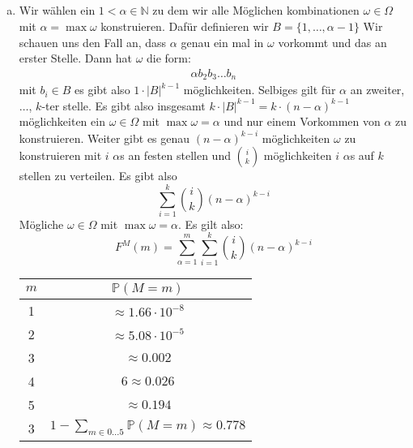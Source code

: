 \documentclass{article}
\newcommand{\N}{\mathbb{N}}
\begin{document}
    \subsection{}
    \begin{enumerate}[a)]
        \item
            Wir wählen ein $1<\alpha\in\N$ zu dem wir alle
            Möglichen kombinationen $\omega\in\Omega$ mit
            $\alpha=\max\omega$ konstruieren.
            Dafür definieren wir $B=\{1,\hdots,\alpha-1\}$
            Wir schauen uns den Fall an, dass $\alpha$ genau
            ein mal in $\omega$ vorkommt und das an erster
            Stelle. Dann hat $\omega$ die form:
            \begin{align*}
                \alpha b_2b_3\hdots b_n
            \end{align*}
            mit $b_i\in B$
            es gibt also $1 \cdot |B|^{k-1}$
            möglichkeiten.
            Selbiges gilt für $\alpha$ an zweiter, $\hdots$,
            $k$-ter stelle.
            Es gibt also insgesamt
            $k\cdot |B|^{k-1}=k\cdot (n-\alpha)^{k-1}$
            möglichkeiten ein $\omega\in\Omega$ mit
            $\max\omega=\alpha$ und nur einem Vorkommen von
            $\alpha$ zu konstruieren.
            Weiter gibt es genau
            $(n-\alpha)^{k-i}$ möglichkeiten $\omega$ zu
            konstruieren mit $i$ $\alpha$s an festen stellen
            und ${i\choose{k}}$ möglichkeiten $i$ $\alpha$s
            auf $k$ stellen zu verteilen.
            Es gibt also
            \begin{equation*}
                \sum_{i=1}^{k}{i\choose k}(n-\alpha)^{k-i}
            \end{equation*}
            Mögliche $\omega\in\Omega$ mit $\max\omega=\alpha$.
            Es gilt also:
            \begin{equation*}
                F^M(m)=\sum_{\alpha=1}^{m}
                \sum_{i=1}^{k}{i\choose k}(n-\alpha)^{k-i}
            \end{equation*}
            \begin{tabular}{c|c}
                \textbf{$m$}&\textbf{$\mathbb P(M=m)$}\\
                \hline
                1&$\approx 1.66\cdot 10^{-8}$\\
                2&$\approx 5.08\cdot 10^{-5}$\\
                3&$\approx 0.002$\\
                4&$6\approx 0.026$\\
                5&$\approx 0.194$\\
                3&$1-\sum_{m\in 0\hdots 5}\mathbb P(M=m)\approx 0.778$
            \end{tabular}\\
\end{enumerate}
\end{document}
